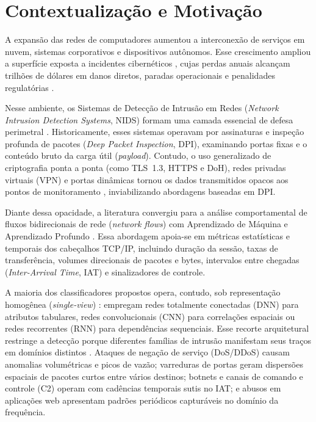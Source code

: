 \section{Contextualização e Motivação}
\label{sec:contextualizacao}

A expansão das redes de computadores aumentou a interconexão de serviços em nuvem, sistemas corporativos e
dispositivos autônomos. Esse crescimento ampliou a superfície exposta a incidentes cibernéticos \cite{cyberrisk2025},
cujas perdas anuais alcançam trilhões de dólares em danos diretos, paradas operacionais e penalidades regulatórias
\cite{aiimpact2026}.

Nesse ambiente, os Sistemas de Detecção de Intrusão em Redes (\emph{Network Intrusion Detection Systems}, NIDS) formam
uma camada essencial de defesa perimetral \cite{advancedids2024, p4nids2025}. Historicamente, esses sistemas operavam
por assinaturas e inspeção profunda de pacotes (\emph{Deep Packet Inspection}, DPI), examinando portas fixas e o
conteúdo bruto da carga útil (\emph{payload}). Contudo, o uso generalizado de criptografia ponta a ponta (como
TLS~1.3, HTTPS e DoH), redes privadas virtuais (VPN) e portas dinâmicas tornou os dados transmitidos opacos aos pontos
de monitoramento \cite{standard2021, trafficmoe2026}, inviabilizando abordagens baseadas em DPI.

Diante dessa opacidade, a literatura convergiu para a análise comportamental de fluxos bidirecionais de rede
(\emph{network flows}) com Aprendizado de Máquina e Aprendizado Profundo \cite{survey2025dl, neuralcyber2025}. Essa
abordagem apoia-se em métricas estatísticas e temporais dos cabeçalhos TCP/IP, incluindo duração da sessão, taxas de
transferência, volumes direcionais de pacotes e bytes, intervalos entre chegadas (\emph{Inter-Arrival Time}, IAT) e
sinalizadores de controle.

A maioria dos classificadores propostos opera, contudo, sob representação homogênea (\emph{single-view})
\cite{timematters2025, temporal2025}: empregam redes totalmente conectadas (DNN) para atributos tabulares, redes
convolucionais (CNN) para correlações espaciais ou redes recorrentes (RNN) para dependências sequenciais. Esse recorte
arquitetural restringe a detecção porque diferentes famílias de intrusão manifestam seus traços em domínios
distintos \cite{ciciot2023, ugr162021}. Ataques de negação de serviço (DoS/DDoS) causam anomalias volumétricas e picos
de vazão; varreduras de portas geram dispersões espaciais de pacotes curtos entre vários destinos; botnets e canais de
comando e controle (C2) operam com cadências temporais sutis no IAT; e abusos em aplicações web apresentam padrões
periódicos capturáveis no domínio da frequência.


